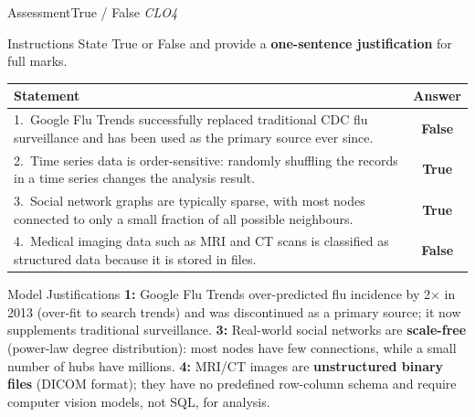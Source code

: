 \documentclass[aspectratio=169,10pt]{beamer}
\begin{document}
\begin{frame}{Assessment\textemdash True / False \hfill\small\textit{CLO4}}
  \begin{block}{Instructions}
    State True or False and provide a \textbf{one-sentence justification} for full marks.
  \end{block}
  \vspace{4pt}
  \centering
  \renewcommand{\arraystretch}{1.6}
  \begin{tabular}{p{9.0cm}c}
    \toprule
    \textbf{Statement} & \textbf{Answer} \\
    \midrule
    1.\ Google Flu Trends successfully replaced traditional CDC flu surveillance and has been used as the primary source ever since. &
    \alert{\textbf{False}} \\
    2.\ Time series data is order-sensitive: randomly shuffling the records in a time series changes the analysis result. &
    \textbf{True} \\
    3.\ Social network graphs are typically sparse, with most nodes connected to only a small fraction of all possible neighbours. &
    \textbf{True} \\
    4.\ Medical imaging data such as MRI and CT scans is classified as structured data because it is stored in files. &
    \alert{\textbf{False}} \\
    \bottomrule
  \end{tabular}
  \vspace{6pt}
  \begin{exampleblock}{Model Justifications}
    \small \textbf{1:} Google Flu Trends over-predicted flu incidence by 2$\times$ in 2013 (over-fit to search trends) and was discontinued as a primary source; it now supplements traditional surveillance.  \textbf{3:} Real-world social networks are \textbf{scale-free} (power-law degree distribution): most nodes have few connections, while a small number of hubs have millions.  \textbf{4:} MRI/CT images are \textbf{unstructured binary files} (DICOM format); they have no predefined row-column schema and require computer vision models, not SQL, for analysis.
  \end{exampleblock}
\end{frame}
\end{document}

